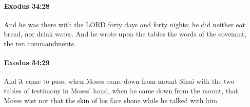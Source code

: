 		\paragraph{Exodus 34:28} %
			\label{EXODUS-34-28}

			And he was there with the LORD forty days and forty nights; he did neither eat bread, nor drink water. And he wrote upon the tables the words of the covenant, the ten commandments.


		\paragraph{Exodus 34:29} %
			\label{EXODUS-34-29}

			And it came to pass, when Moses came down from mount Sinai with the two tables of testimony in Moses' hand, when he came down from the mount, that Moses wist not that the skin of his face shone while he talked with him.

